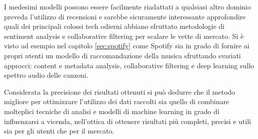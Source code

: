 \documentclass[hidelinks, 12pt]{article}
\begin{document}
I medesimi modelli possono essere facilmente riadattati a qualsiasi altro dominio preveda l'utilizzo di recensioni e sarebbe sicuramente interessante approfondire quali dei principali colossi tech odierni abbiano sfruttato metodologie di sentiment analysis e collaborative filtering per scalare le vette di mercato. Si è visto ad esempio nel capitolo \ref{sec:spotify} come Spotify sia in grado di fornire ai propri utenti un modello di raccomandazione della musica sfruttando svariati approcci: content e metadata analysis, collaborative filtering e deep learning sullo spettro audio delle canzoni.

Considerata la precisione dei risultati ottenuti si può dedurre che il metodo migliore per ottimizzare l'utilizzo dei dati raccolti sia quello di combinare molteplici tecniche di analisi e modelli di machine learning in grado di influenzarsi a vicenda, nell'ottica di ottenere risultati più completi, precisi e utili sia per gli utenti che per il mercato.





\newpage


	
\end{document}
